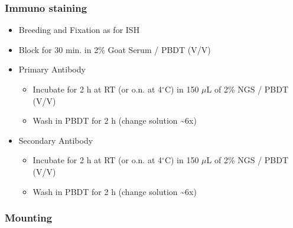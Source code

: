 \documentclass[11pt,singlespacinge,twoside]{reedthesis} %
\providecommand{\tightlist}{%
  \setlength{\itemsep}{0pt}\setlength{\parskip}{0pt}}
\begin{document}
\hypertarget{immuno-met}{%
\subsubsection{Immuno staining}\label{immuno-met}}
\begin{itemize}
\tightlist
\item
  Breeding and Fixation as for ISH
\item
  Block for 30 min. in 2\% Goat Serum / PBDT (V/V)
\item
  Primary Antibody
  \begin{itemize}
  \tightlist
  \item
    Incubate for 2 h at RT (or o.n. at 4\(^\circ\)C) in 150 \(\mu\)L of 2\% NGS / PBDT (V/V)
  \item
    Wash in PBDT for 2 h (change solution \textasciitilde{}6x)
  \end{itemize}
\item
  Secondary Antibody
  \begin{itemize}
  \tightlist
  \item
    Incubate for 2 h at RT (or o.n. at 4\(^\circ\)C) in 150 \(\mu\)L of 2\% NGS / PBDT (V/V)
  \item
    Wash in PBDT for 2 h (change solution \textasciitilde{}6x)
  \end{itemize}
\end{itemize}
\hypertarget{mount-met}{%
\subsubsection{Mounting}\label{mount-met}}
\end{document}
